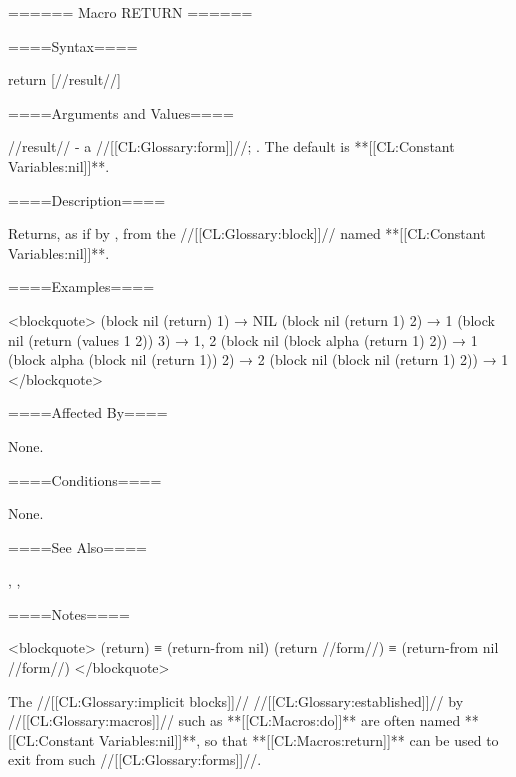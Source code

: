 ====== Macro RETURN ======

====Syntax====

\DefmacNoReturn return {[//result//]}

====Arguments and Values====

//result// - a //[[CL:Glossary:form]]//; \eval. The default is **[[CL:Constant Variables:nil]]**.

====Description====

Returns, as if by , from the //[[CL:Glossary:block]]// named **[[CL:Constant Variables:nil]]**.

====Examples====

<blockquote> (block nil (return) 1) → NIL (block nil (return 1) 2) → 1 (block nil (return (values 1 2)) 3) → 1, 2 (block nil (block alpha (return 1) 2)) → 1 (block alpha (block nil (return 1)) 2) → 2 (block nil (block nil (return 1) 2)) → 1 </blockquote>

====Affected By====

None.

====Conditions====

None.

====See Also====

, , {\secref\Evaluation}

====Notes====

<blockquote> (return) ≡ (return-from nil) (return //form//) ≡ (return-from nil //form//) </blockquote>

The //[[CL:Glossary:implicit blocks]]// //[[CL:Glossary:established]]// by //[[CL:Glossary:macros]]// such as **[[CL:Macros:do]]** are often named **[[CL:Constant Variables:nil]]**, so that **[[CL:Macros:return]]** can be used to exit from such //[[CL:Glossary:forms]]//.

